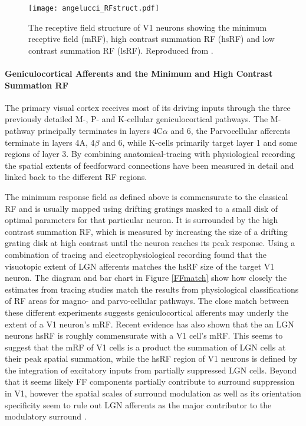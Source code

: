\begin{figure}
	\centering
        \texttt{[image: angelucci\_RFstruct.pdf]}
	\caption[The structure of a receptive field in V1. Reproduced from
      \cite{Angelucci2006}.]{The receptive field structure of V1
      neurons showing the minimum receptive field (mRF), high contrast
      summation RF (hsRF) and low contrast summation RF
      (lsRF). Reproduced from \cite{Angelucci2006}.}
	\label{RFstruct}
\end{figure}

\paragraph{Geniculocortical Afferents and the Minimum and High Contrast Summation RF} \label{AfferentBackground}


The primary visual cortex receives most of its driving inputs through
the three previously detailed M-, P- and K-cellular geniculocortical
pathways. The M-pathway principally terminates in layers 4C$\alpha$
and 6, the Parvocellular afferents terminate in layers 4A, 4$\beta$
and 6, while K-cells primarily target layer 1 and some regions of
layer 3. By combining anatomical-tracing with physiological
recording the spatial extents of feedforward connections have been
measured in detail and linked back to the different RF regions.

The minimum response field as defined above is commensurate to the
classical RF and is usually mapped using drifting gratings masked to a
small disk of optimal parameters for that particular neuron. It is
surrounded by the high contrast summation RF, which is measured by
increasing the size of a drifting grating disk at high contrast until
the neuron reaches its peak response. Using a combination of tracing
and electrophysiological recording \citep{Angelucci2006a} found that
the visuotopic extent of LGN afferents matches the hsRF size of the
target V1 neuron. The diagram and bar chart in Figure \ref{FFmatch}
show how closely the estimates from tracing studies match the results
from physiological classifications of RF areas for magno- and
parvo-cellular pathways. The close match between these different
experiments suggests geniculocortical afferents may underly the extent
of a V1 neuron's mRF. Recent evidence has also shown that the an LGN
neurons hsRF is roughly commensurate with a V1 cell's mRF. This seems
to suggest that the mRF of V1 cells is a product the summation of LGN
cells at their peak spatial summation, while the hsRF region of V1
neurons is defined by the integration of excitatory inputs from
partially suppressed LGN cells. Beyond that it seems likely FF
components partially contribute to surround suppression in V1, however
the spatial scales of surround modulation as well as its orientation
specificity seem to rule out LGN afferents as the major contributor to
the modulatory surround \citep{Angelucci2002,Angelucci2006a}.


